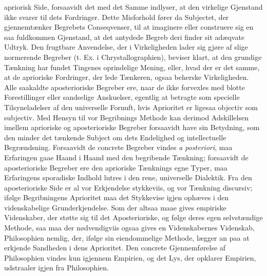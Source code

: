 \documentclass[12pt]{book}
\newcommand{\opage}[1]{\marginnote{\footnotesize\textit{[#1]}}}
\begin{document}
apriorisk Side, forsaavidt det med det Samme indlyser, at den virkelige
Gjenstand ikke svarer til dets Fordringer. Dette Misforhold fører da
Subjectet, der gjennemtænker Begrebets Conseqvenser, til at imaginere eller
construere sig en saa fuldkommen Gjenstand, at det antydede Begreb deri finder
sit adæqvate Udtryk. Den frugtbare Anvendelse, der i Virkeligheden lader sig
gjøre af slige normerende Begreber (t. Ex. i Chrystallographien), beviser
klart, at den grundige Tænkning har fundet Tingenes oprindelige Mening, eller,
hvad der er det samme, at de aprioriske Fordringer, der lede Tænkeren, ogsaa
beherske Virkeligheden. Alle saakaldte aposterioriske Begreber ere, naar de
ikke forvexles med blotte Forestillinger eller sandselige Anskuelser, egentlig
at betragte som specielle Tilsyneladelser af den universelle Fornuft, hvis
Aprioritet er ligesaa objectiv som subjectiv. Med Hensyn til vor Begribnings
Methode
\opage{25} kan derimod Adskillelsen imellem aprioriske og aposterioriske Begreber
forsaavidt have sin Betydning, som den minder det tænkende Subject om dets
Endelighed og intellectuelle Begrændsning. Forsaavidt de concrete Begreber
vindes \textit{a posteriori}, maa Erfaringen gaae Haand i Haand med den
begribende Tænkning; forsaavidt de aposterioriske Begreber ere den aprioriske
Tænknings egne Typer, maa Erfaringens sporadiske Indhold lutres i den rene,
universelle Dialektik. Fra den aposterioriske Side er al vor Erkjendelse
stykkeviis, og vor Tænkning discursiv; ifølge Begribningens Aprioritet maa det
Stykkevise igjen ophæves i den videnskabelige Grunderkjendelse. Som der altsaa
maae gives empiriske Videnskaber, der støtte sig til det Aposterioriske, og
følge deres egen selvstændige Methode, saa maa der nødvendigviis ogsaa gives
en Videnskabernes Videnskab, Philosophien nemlig, der, ifølge sin
eiendommelige Methode, lægger an paa at erkjende Sandheden i dens Aprioritet.
Den concrete Gjennemførelse af Philosophien vindes kun igjennem Empirien, og
det Lys, der opklarer Empirien, udstraaler igjen fra Philosophien.
\end{document}
